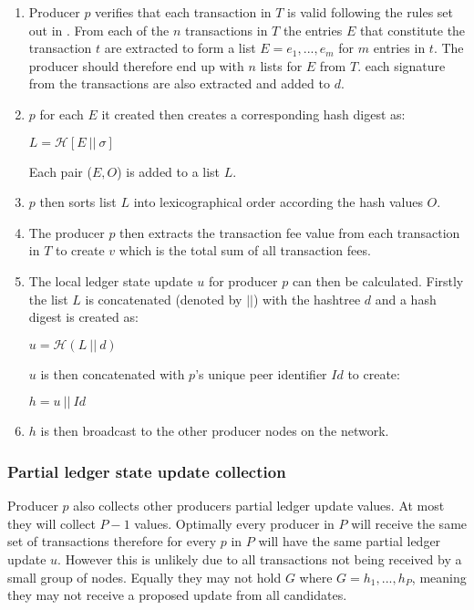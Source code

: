 \documentclass{article}
\begin{document}
\begin{enumerate}
\item Producer $p$ verifies that each transaction in $T$ is valid following the rules set out in \cite{transactionvalidator}. From each of the $n$ transactions in $T$ the entries $E$ that constitute the transaction $t$ are extracted to form a list $E = e_1,...,e_m$ for $m$ entries in $t$. The producer should therefore end up with $n$ lists for $E$ from $T$. each signature from the transactions are also extracted and added to $d$.

\item $p$ for each $E$ it created then creates a corresponding hash digest as: 
\begin{center}
$L = \mathcal{H}[E~||~\sigma]$
\end{center}

Each pair ($E,O$) is added to a list $L$. 

\item $p$ then sorts list $L$ into lexicographical order according the hash values $O$.

\item The producer $p$ then extracts the transaction fee value from each transaction in $T$ to create $v$ which is the total sum of all transaction fees. 

\item The local ledger state update $u$ for producer $p$ can then be calculated. Firstly the list $L$ is concatenated (denoted by $||$) with the hashtree $d$ and a hash digest is created as: 

\begin{center}
$u = \mathcal{H}(L~||~d)$
\end{center}  

$u$ is then concatenated with $p$'s unique peer identifier $Id$ to create:

\begin{center} 
$h = u ~||~Id$
\end{center}

\item $h$ is then broadcast to the other producer nodes on the network. 
\end{enumerate}

\subsubsection{Partial ledger state update collection}


Producer $p$ also collects other producers partial ledger update values. At most they will collect $P-1$ values. Optimally every producer in $P$ will receive the same set of transactions therefore for every $p$ in $P$ will have the same partial ledger update $u$. However this is unlikely due to all transactions not being received by a small group of nodes. Equally they may not hold $G$ where $G = h_1,...,h_P$, meaning they may not receive a proposed update from all candidates. 
\end{document}
